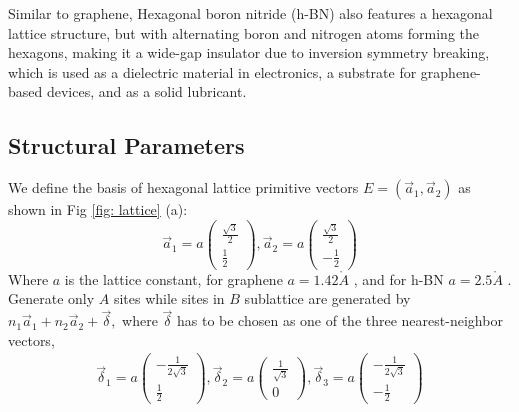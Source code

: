 Similar to graphene, Hexagonal boron nitride (\gls{h-BN}) also features a hexagonal lattice structure, but with alternating boron and nitrogen atoms forming the hexagons, making it a wide-gap insulator due to inversion symmetry breaking, which is used as a dielectric material in electronics, a substrate for graphene-based devices, and as a solid lubricant.
\subsection{Structural Parameters}
 We define the basis of hexagonal lattice primitive vectors $E = (\vec{a}_{1}, \vec{a}_{2})$ as shown in Fig \ref{fig: lattice} (a):
$$
\vec{a}_{1}=a\left(\begin{array}{l}
\frac{\sqrt{3}}{2} \\
\frac{1}{2}
\end{array}\right),
\vec{a}_{2}=a\left(\begin{array}{l}
\frac{\sqrt{3}}{2} \\
-\frac{1}{2}
\end{array}\right)
$$
Where $a$ is the lattice constant, for graphene $a= 1.42 \mathring{A}$ \cite{sarma2011electronic}, and for \gls{h-BN} $a= 2.5 \mathring{A}$ \cite{PhysRevB.81.155433}. Generate only $A$ sites while sites in $B$ sublattice are generated by $n_{1} \vec{a}_{1}+n_{2} \vec{a}_{2}+\vec{\delta},$ where $\vec{\delta}$ has to be chosen as one of the three nearest-neighbor vectors,
$$
\begin{array}{c}
\vec{\delta}_{1}=a\left(\begin{array}{l}
-\frac{1}{2 \sqrt{3}}\\ \frac{1}{2}\end{array}\right), 
\vec{\delta}_{2}=a\left(\begin{array}{l}\frac{1}{\sqrt{3}}\\ 0 \end{array}\right),
\vec{\delta}_{3}=a\left(\begin{array}{l} -\frac{1}{2 \sqrt{3}}\\ -\frac{1}{2}\end{array}\right)
\end{array}
$$
